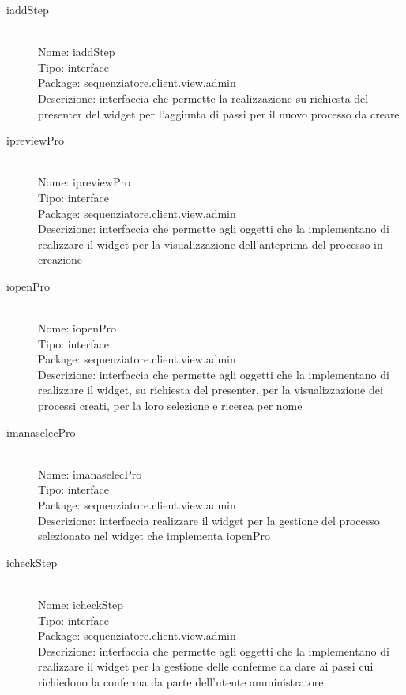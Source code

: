 \begin{description}
	\item[iaddStep] 
  	\hfill \\
  	Nome: iaddStep\\
  	Tipo: interface\\
	Package: sequenziatore.client.view.admin\\
	Descrizione: interfaccia che permette la realizzazione su richiesta del presenter del widget per l'aggiunta di passi per il nuovo processo da creare
\end{description}

\begin{description}
	\item[ipreviewPro] 
  	\hfill \\
  	Nome: ipreviewPro\\
  	Tipo: interface\\
	Package: sequenziatore.client.view.admin\\
	Descrizione: interfaccia che permette agli oggetti che la implementano di realizzare il widget per la visualizzazione dell'anteprima del processo in creazione
\end{description}

\begin{description}
	\item[iopenPro] 
  	\hfill \\
  	Nome: iopenPro\\
  	Tipo: interface\\
	Package: sequenziatore.client.view.admin\\
	Descrizione: interfaccia che permette agli oggetti che la implementano di realizzare il widget, su richiesta del presenter, per la visualizzazione dei processi creati, per la loro selezione e ricerca per nome
\end{description}

\begin{description}
	\item[imanaselecPro] 
  	\hfill \\
  	Nome: imanaselecPro\\
  	Tipo: interface\\
	Package: sequenziatore.client.view.admin\\
	Descrizione: interfaccia realizzare il widget per la gestione del processo selezionato nel widget che implementa iopenPro
\end{description}

\begin{description}
	\item[icheckStep] 
  	\hfill \\
  	Nome: icheckStep\\
  	Tipo: interface\\
	Package: sequenziatore.client.view.admin\\
	Descrizione: interfaccia che permette agli oggetti che la implementano di realizzare il widget per la gestione delle conferme da dare ai passi cui richiedono la conferma da parte dell'utente amministratore
\end{description}

